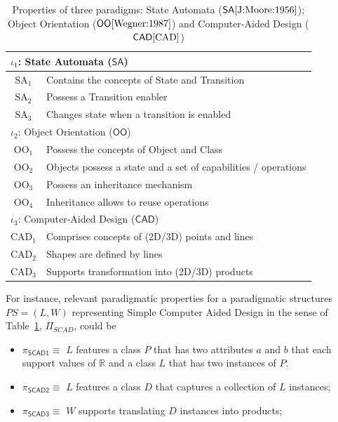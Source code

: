 \begin{table}[t]
   \begin{center}
      \begin{tabular}[t]{c l}
         \hline
         \multicolumn{2}{l}{$\iota_1$: State Automata ($\mathsf{SA}$)}\\
         \hline
         $\mbox{SA}_1$ & Contains the concepts of State and Transition\\
         $\mbox{SA}_2$ & Possess a Transition enabler\\
         $\mbox{SA}_3$ & Changes state when a transition is enabled\\
         \hline\hline
         \multicolumn{2}{l}{$\iota_2$: Object Orientation ($\mathsf{OO}$)}\\
         \hline
         $\mbox{OO}_1$ & Possess the concepts of Object and Class\\
         $\mbox{OO}_2$ & Objects possess a state and a set of capabilities / operations \\
         $\mbox{OO}_3$ & Possess an inheritance mechanism\\
         $\mbox{OO}_4$ & Inheritance allows to reuse operations\\
         \hline\hline
         \multicolumn{2}{l}{$\iota_3$: Computer-Aided Design ($\mathsf{CAD}$)}\\
         \hline
         $\mbox{CAD}_1$ & Comprises concepts of (2D/3D) points and lines\\
         $\mbox{CAD}_2$ & Shapes are defined by lines\\
         $\mbox{CAD}_3$ & Supports transformation into (2D/3D) products\\
         \hline
      \end{tabular}
   \end{center}
   \label{tab:Properties}
   \caption{Properties of three paradigms: State Automata ($\mathsf{SA} 
\cite{J:Moore:1956}$); Object Orientation ($\mathsf{OO} \cite{Wegner:1987}$) 
and Computer-Aided Design ($\mathsf{CAD} \cite{CAD}$)}
\end{table}


For instance, relevant paradigmatic properties for a paradigmatic structures $PS
= \left(L,W\right)$ representing Simple Computer Aided Design in the sense of
Table~\ref{tab:Properties}, $\Pi_{SCAD}$, could be
\begin{itemize}
\item $\pi_{\mathsf{SCAD1}} \equiv$ $L$ features a class $P$ that has two 
attributes $a$ and $b$ that each support values of $\mathbb{R}$ and a class $L$ 
that has two instances of $P$. 
\item $\pi_{\mathsf{SCAD2}} \equiv$ $L$ features a class $D$ that captures a 
collection of $L$ instances; 
 
\item $\pi_{\mathsf{SCAD3}} \equiv$ $W$ supports translating $D$ instances into 
products;
\end{itemize}

